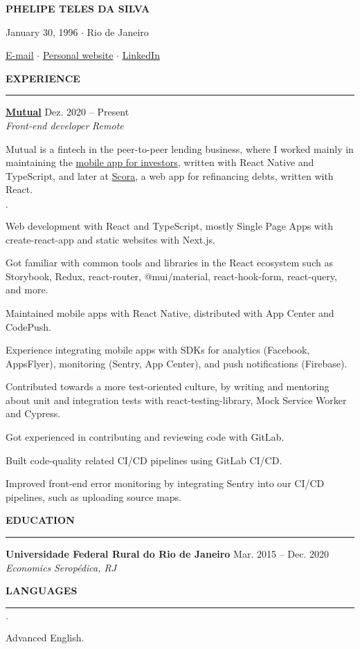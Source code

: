 \documentclass[12pt,letterpaper]{article}
\newenvironment{tightlist}
  {\begin{list}
    {$\cdot$}
    {
      \setlength{\leftmargin}{0em}
      \setlength{\itemsep}{-\smallskipamount}
    }
  }
{\end{list}}
\begin{document}
\pagestyle{empty}

\centerline{\huge\bf PHELIPE TELES DA SILVA}
\medskip

\centerline{January 30, 1996 $\cdot$ Rio de Janeiro}
\smallskip

\centerline{
  \href{mailto:telesphelipe@gmail.com}{E-mail}
  $\cdot$
  \href{https://phelipetls.github.io}{Personal website}
  $\cdot$
  \href{https://linkedin.com/in/phelipeteles}{LinkedIn}
}
\smallskip

\medskip \textbf{EXPERIENCE} \medskip
\hrule

\textbf{\href{https://mutual.club}{Mutual}} \hfill Dez. 2020 -- Present \\
\emph{Front-end developer} \hfill \emph{Remote} {\parfillskip=0pt\par}

Mutual is a fintech in the peer-to-peer lending business, where I worked mainly
in maintaining the \href{https://mutual.club/en/invest.html}{mobile app for
investors}, written with React Native and TypeScript, and later at
\href{https://scora.com.br/}{Scora}, a web app for refinancing debts, written
with React.

\medskip

\begin{tightlist}
  \item Web development with React and TypeScript, mostly Single Page Apps with
    create-react-app and static websites with Next.js.
  \item Got familiar with common tools and libraries in the React ecosystem such
    as Storybook, Redux, react-router, @mui/material, react-hook-form,
    react-query, and more.
  \item Maintained mobile apps with React Native, distributed with App Center
    and CodePush.
  \item Experience integrating mobile apps with SDKs for analytics (Facebook,
    AppsFlyer), monitoring (Sentry, App Center), and push notifications
    (Firebase).
  \item Contributed towards a more test-oriented culture, by writing and
    mentoring about unit and integration tests with react-testing-library, Mock
    Service Worker and Cypress.
  \item Got experienced in contributing and reviewing code with GitLab.
  \item Built code-quality related CI/CD pipelines using GitLab CI/CD.
  \item Improved front-end error monitoring by integrating Sentry into our CI/CD
    pipelines, such as uploading source maps.
\end{tightlist}

\medskip \textbf{EDUCATION} \medskip
\hrule

\textbf{Universidade Federal Rural do Rio de Janeiro} \hfill {Mar. 2015 -- Dec. 2020} \\
\emph{Economics} \hfill \emph{Seropédica, RJ} {\parfillskip=0pt\par}

\medskip \textbf{LANGUAGES} \medskip
\hrule

\begin{tightlist}
  \item Advanced English.
\end{tightlist}
\end{document}
